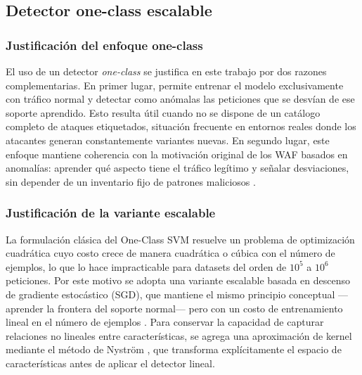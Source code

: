 \documentclass[12pt,oneside]{report}
\begin{document}
\subsection{Detector one-class escalable}

\subsubsection{Justificación del enfoque one-class}
El uso de un detector \textit{one-class} se justifica en este trabajo por dos razones complementarias. En primer lugar, permite entrenar el modelo exclusivamente con tráfico normal y detectar como anómalas las peticiones que se desvían de ese soporte aprendido. Esto resulta útil cuando no se dispone de un catálogo completo de ataques etiquetados, situación frecuente en entornos reales donde los atacantes generan constantemente variantes nuevas. En segundo lugar, este enfoque mantiene coherencia con la motivación original de los WAF basados en anomalías: aprender qué aspecto tiene el tráfico legítimo y señalar desviaciones, sin depender de un inventario fijo de patrones maliciosos \cite{kruegel_vigna_2003}.

\subsubsection{Justificación de la variante escalable}
La formulación clásica del One-Class SVM \cite{scholkopf2001} resuelve un problema de optimización cuadrática cuyo costo crece de manera cuadrática o cúbica con el número de ejemplos, lo que lo hace impracticable para datasets del orden de $10^5$ a $10^6$ peticiones. Por este motivo se adopta una variante escalable basada en descenso de gradiente estocástico (SGD), que mantiene el mismo principio conceptual —aprender la frontera del soporte normal— pero con un costo de entrenamiento lineal en el número de ejemplos \cite{sklearn_sgd_ocsvm}. Para conservar la capacidad de capturar relaciones no lineales entre características, se agrega una aproximación de kernel mediante el método de Nyström \cite{williams2001,sklearn_kernel_approx}, que transforma explícitamente el espacio de características antes de aplicar el detector lineal.
\end{document}
